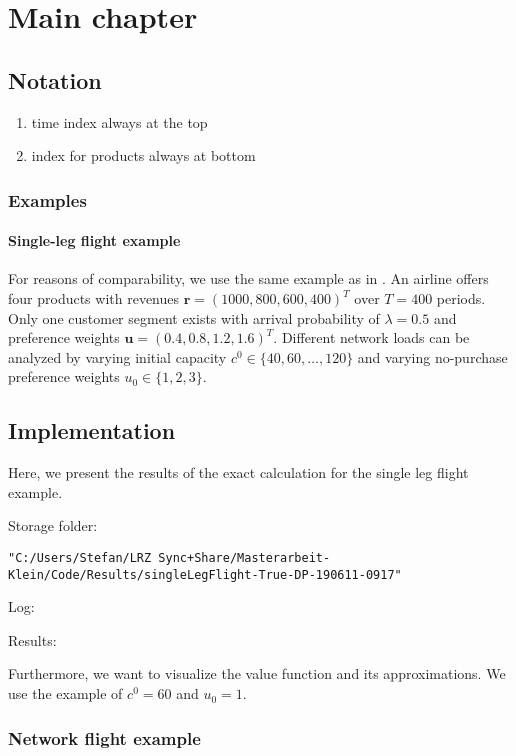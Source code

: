 \chapter{Main chapter}

\section{Notation}
\begin{enumerate}
	\item time index always at the top
	\item index for products always at bottom
\end{enumerate}



\subsection{Examples}

\subsubsection{Single-leg flight example}

For reasons of comparability, we use the same example as in \cite{Koch.2017}. An airline offers four products with revenues $\boldsymbol{r} = (1000, 800, 600, 400)^T$ over $T = 400$ periods. Only one customer segment exists with arrival probability of $\lambda = 0.5$ and preference weights $\boldsymbol{u} = (0.4, 0.8, 1.2, 1.6)^T$. Different network loads can be analyzed by varying initial capacity $c^0 \in \{40, 60, \dots, 120\}$ and varying no-purchase preference weights $u_0 \in \{1,2,3\}$.

\section{Implementation}

Here, we present the results of the exact calculation for the single leg flight example.

Storage folder: 

\texttt{"C:/Users/Stefan/LRZ Sync+Share/Masterarbeit-Klein/Code/Results/singleLegFlight-True-DP-190611-0917"}

Log:



Results:



Furthermore, we want to visualize the value function and its approximations. We use the example of $c^0 = 60$ and $u_0 = 1$. 

\subsection{Network flight example}


